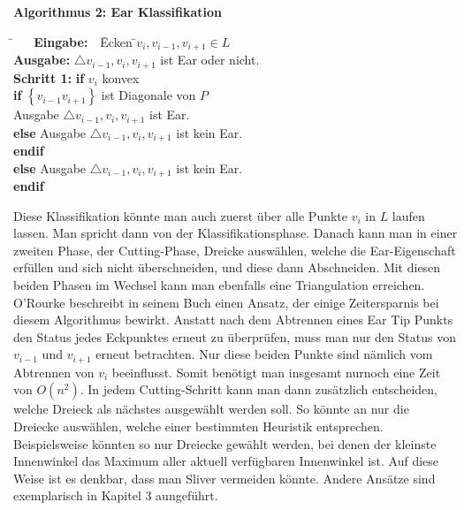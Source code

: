 \begin{flushleft}
  { \textbf{Algorithmus 2: Ear Klassifikation}
        \begin{tabbing}
          \=$~~~~~~$ \= \textbf{Eingabe:} $~~~$\=  Ecken \=${v_i, v_{i-1}, v_{i+1}} \in L$  $~~~~~~~~$\= \\
          \> \> \textbf{Ausgabe:} \> $\triangle v_{i-1}, v_i, v_{i+1}$ ist Ear oder nicht.\\
          \> \> \textbf{Schritt 1:} \>\textbf{if} $v_i$ konvex\\
          \> \> \> \>\textbf{if} $\left\{v_{i-1}v_{i+1}\right\}$ ist Diagonale von $P$\\
          \> \> \> \> \>Ausgabe $\triangle v_{i-1}, v_i, v_{i+1}$ ist Ear.\\
          \> \> \> \> \textbf{else} \>Ausgabe $\triangle v_{i-1}, v_i, v_{i+1}$ ist kein Ear.\\
          \> \> \> \> \textbf{endif}\\
          \> \> \> \textbf{else} Ausgabe $\triangle v_{i-1}, v_i, v_{i+1}$ ist kein Ear.\\
          \> \> \> \textbf{endif}\\
        \end{tabbing}
}
\end{flushleft}
Diese Klassifikation könnte man auch zuerst über alle Punkte $v_i$ in $L$ laufen lassen. Man spricht dann von der Klassifikationsphase. 
Danach kann man in einer zweiten Phase, der Cutting-Phase, Dreicke auswählen, welche die Ear-Eigenschaft erfüllen und sich nicht überschneiden, 
und diese dann Abschneiden. Mit diesen beiden Phasen im Wechsel kann man ebenfalls eine Triangulation erreichen. 
O'Rourke beschreibt in seinem Buch einen Ansatz, der einige Zeitersparnis bei diesem Algorithmus bewirkt.\cite{orourke}
Anstatt nach dem Abtrennen eines Ear Tip Punkts den Status jedes Eckpunktes erneut zu überprüfen, muss man nur den Status von $v_{i-1}$ und $v_{i+1}$ erneut betrachten.
Nur diese beiden Punkte sind nämlich vom Abtrennen von $v_i$ beeinflusst. Somit benötigt man insgesamt nurnoch eine Zeit von $O(n^2)$.\cite{newAlg} 
In jedem Cutting-Schritt kann man dann zusätzlich entscheiden, welche Dreieck als nächstes ausgewählt werden soll. So könnte an nur die Dreiecke auswählen, welche einer bestimmten Heuristik entsprechen.
Beispielsweise könnten so nur Dreiecke gewählt werden, bei denen der kleinste Innenwinkel das Maximum aller aktuell verfügbaren Innenwinkel ist. Auf diese Weise ist es denkbar,
dass man Sliver vermeiden könnte. Andere Ansätze sind exemplarisch in Kapitel 3 aungeführt.

